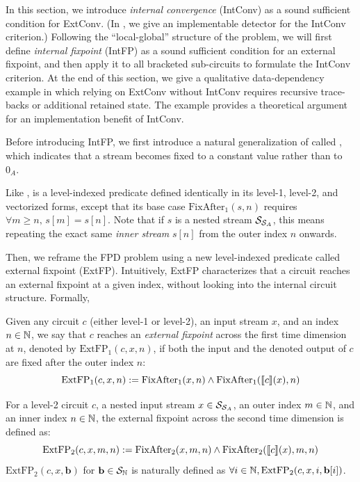 In this section, we introduce \emph{internal convergence}
(IntConv)
as a sound sufficient condition for ExtConv.
(In , we give an implementable detector for the IntConv criterion.)
Following the ``local-global'' structure of the problem, we will first define \emph{internal fixpoint} (IntFP) as a sound sufficient condition for an external fixpoint, and then
apply it
to all bracketed sub-circuits to 
formulate
the IntConv criterion.
At the end of this section, we give a qualitative data-dependency example in which relying on ExtConv without IntConv requires recursive trace-backs or additional retained state. The example provides a theoretical argument for an implementation benefit of IntConv.


Before introducing IntFP, we first introduce a natural generalization of  called , which indicates that a stream becomes fixed to a constant value rather than to $0_A$.
\begin{definition}[FixAfter]
    Like ,  is a level-indexed predicate defined identically in its level-1, level-2, and vectorized forms, except that its base case $\text{FixAfter}_1(s, n)$ requires $\forall m \ge n,\, s[m] = s[n]$. Note that if $s$ is a nested stream $\mathcal{S}_{\mathcal{S}_{A}}$, this means repeating the exact same \emph{inner stream} $s[n]$ from the outer index $n$ onwards.
\end{definition}

Then, we reframe the FPD problem using a new level-indexed predicate called external fixpoint (ExtFP). Intuitively, ExtFP characterizes that a circuit reaches an external fixpoint at a given index, without looking into the internal circuit structure. Formally, 

\begin{definition}
    Given any circuit $c$ (either level-1 or level-2), an input stream $x$, and an index $n \in \mathbb{N}$, we say that $c$ reaches an \emph{external fixpoint} across the first time dimension at $n$, denoted by $\text{ExtFP}_1(c, x, n)$, if both the input and the denoted output of $c$ are fixed after the outer index $n$:
    \[ \text{ExtFP}_1(c, x, n) := \text{FixAfter}_1(x, n) \land \text{FixAfter}_1(\llbracket c \rrbracket(x), n) \]

    For a level-2 circuit $c$, a nested input stream $x \in \mathcal{S}_{\mathcal{S}_{A}}$, an outer index $m \in \mathbb{N}$, and an inner index $n \in \mathbb{N}$, the external fixpoint across the second time dimension is defined as:
    \[ \text{ExtFP}_2(c, x, m, n) := \text{FixAfter}_2(x, m, n) \land \text{FixAfter}_2(\llbracket c \rrbracket(x), m, n) \]
    $\text{ExtFP}_2(c, x, \mathbf{b})$ for $\mathbf{b} \in \mathcal{S}_{\mathbb{N}}$ is naturally defined as $\forall i \in \mathbb{N}, \text{ExtFP}_2(c, x, i, \mathbf{b}[i])$.
\end{definition}


